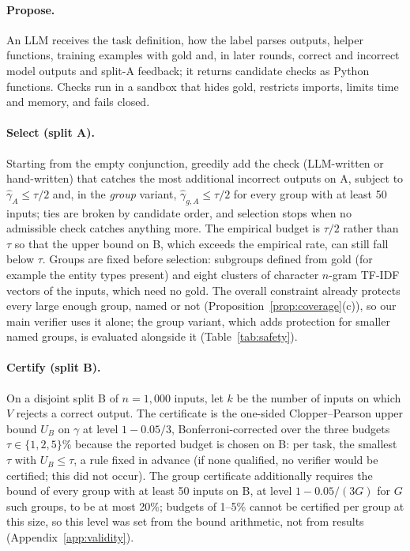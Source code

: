 \documentclass[11pt]{article}
\newcommand{\UB}{U_{\!B}}
\begin{document}
\paragraph{Propose.} An LLM receives the task definition, how the label
parses outputs, helper functions, training examples with gold and, in later
rounds, correct and incorrect model outputs and split-A feedback; it returns
candidate checks as Python functions. Checks run in a sandbox that hides
gold, restricts imports, limits time and memory, and fails closed.

\paragraph{Select (split A).} Starting from the empty conjunction, greedily
add the check (LLM-written or hand-written) that catches the most additional
incorrect outputs on A, subject to $\hat\gamma_A\le\tau/2$ and, in the
\emph{group} variant, $\hat\gamma_{g,A}\le\tau/2$ for every group with at
least 50 inputs; ties are broken by candidate order, and selection stops when
no admissible check catches anything more. The empirical budget is $\tau/2$
rather than $\tau$ so that the upper bound on B, which exceeds the
empirical rate, can still fall below $\tau$. Groups are fixed before
selection: subgroups defined from gold (for example the entity types
present) and eight clusters of character $n$-gram TF-IDF vectors of the
inputs, which need no gold. The overall constraint already protects every
large enough group, named or not (Proposition~\ref{prop:coverage}(c)), so
our main verifier uses it alone; the group variant, which adds protection
for smaller named groups, is evaluated alongside it
(Table~\ref{tab:safety}).

\paragraph{Certify (split B).} On a disjoint split B of $n=1{,}000$
inputs, let $k$ be the number of inputs on which $V$ rejects a correct
output. The certificate is the one-sided Clopper--Pearson upper bound $\UB$
on $\gamma$ at level $1-0.05/3$, Bonferroni-corrected over the three
budgets $\tau\in\{1,2,5\}\%$ because the reported budget is chosen on B:
per task, the smallest $\tau$ with $\UB\le\tau$, a rule fixed in advance
(if none qualified, no verifier would be certified; this did not occur).
The group certificate additionally requires the bound of every group with
at least 50 inputs on B, at level $1-0.05/(3G)$ for $G$ such groups, to be
at most 20\%; budgets of 1--5\% cannot be certified per group at this size,
so this level was set from the bound arithmetic, not from results
(Appendix~\ref{app:validity}).
\end{document}
